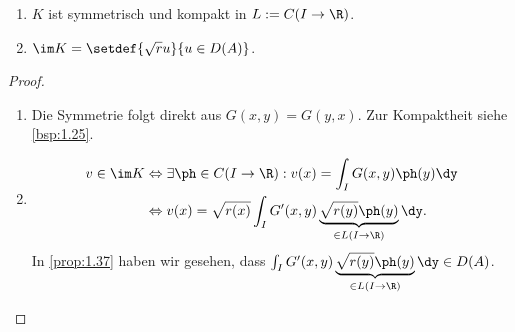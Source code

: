 \begin{lem}
\label{prop:1.43}
\begin{enumerate}[label=\arabic{*}.)]
  \item $K$ ist symmetrisch und kompakt in $L:=C(I\to\R)$.
  \item $\im K = \setdef{\sqrt{r}u}{u\in D(A)}$.\fishhere
\end{enumerate}
\end{lem}
\begin{proof}
\begin{enumerate}[label=\arabic{*}.)]
  \item Die Symmetrie folgt direkt aus $G(x,y)=G(y,x)$. Zur Kompaktheit
  siehe \ref{bsp:1.25}.
  \item
\begin{align*}
v\in \im K &\Leftrightarrow \exists \ph \in C(I\to\R) : v(x) = \int_I
G(x,y)\ph(y)\dy\\
& \Leftrightarrow v(x)=\sqrt{r(x)}\int_I
G'(x,y)\underbrace{\sqrt{r(y)}\ph(y)}_{\in L(I\to\R)}\dy.
\end{align*}
In \ref{prop:1.37} haben wir gesehen, dass $\int_I
G'(x,y)\underbrace{\sqrt{r(y)}\ph(y)}_{\in L(I\to\R)}\dy\in D(A)$.\qedhere
\end{enumerate}
\end{proof}

